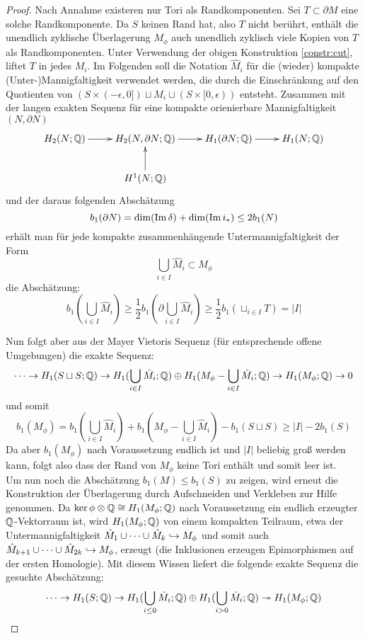 \begin{proof}
	 Nach Annahme existeren nur Tori als Randkomponenten. Sei $T \subset \partial M$ eine solche Randkomponente. Da $S$ keinen Rand hat, also $T$ nicht berührt, enthält die unendlich zyklische Überlagerung $M_\phi$ auch unendlich zyklisch viele Kopien von $T$ als Randkomponenten. Unter Verwendung der obigen Konstruktion \ref{constr:cut}, liftet $T$ in jedes $M_i$. Im Folgenden soll die Notation $\hat M_i$ für die (wieder) kompakte (Unter-)Mannigfaltigkeit verwendet werden, die durch die Einschränkung auf den Quotienten von $(S\times (-\epsilon,0]) \sqcup M_i \sqcup (S\times[0,\epsilon))$   entsteht. Zusammen mit der langen exakten Sequenz für eine kompakte orienierbare Mannigfaltigkeit $(N,\partial N)$
	\[
	 \begin{xy}
	 	\xymatrix{
	 	H_2(N;\QQ) \ar[r]&  H_2(N,\partial N ; \QQ) \ar[r]& H_1(\partial N;\QQ) \ar[r]& H_1(N;\QQ) \\
	 	& H^1(N;\QQ)\ar[u]&&}
	 \end{xy}
	 \] 
	 und der daraus folgenden Abschätzung
	 \[
	 	b_1(\partial N) = \dim(\operatorname{Im} \delta) + \dim(\operatorname{Im} i_*) \leq  2b_1(N)
	 \]
	 erhält man für jede kompakte zusammenhängende Untermannigfaltigkeit der Form
	 \[
	  	\bigcup_{i\in I} \hat M_i \subset M_\phi
	  \]
	  die Abschätzung:
	  \[
	   	b_1(\bigcup_{i\in I} \hat M_i)\geq \frac{1}{2}b_1(\partial \bigcup_{i\in I} \hat M_i) \geq \frac{1}{2}b_1(\sqcup_{i \in I}T) = |I|
	  \]


	  Nun folgt aber aus der Mayer Vietoris Sequenz (für entsprechende offene Umgebungen) die exakte Sequenz:
	  \[
	  	\cdots\to H_1(S\sqcup S;\mathbb{Q}) \to H_1(\bigcup_{i \in I} \hat M_i;\mathbb{Q}) \oplus H_1(M_\phi -\bigcup_{i \in I} \hat M_i;\mathbb{Q}) \to H_1(M_\phi;\mathbb{Q}) \to 0
	  \]
	  und somit
	  \[
	  	b_1(M_\phi)= b_1(\bigcup_{i \in I} \hat M_i)+b_1(M_\phi -\bigcup_{i \in I} \hat M_i)-b_1(S\sqcup S) \geq |I| -2b_1(S)
	  \]
	  Da aber $b_1(M_\phi)$ nach Voraussetzung endlich ist und $|I|$ beliebig groß werden kann, folgt also dass der Rand von $M_\phi$ keine Tori enthält und somit leer ist.\\
	  Um nun noch die Abschätzung $b_1(M) \leq b_1(S)$ zu zeigen, wird erneut die Konstruktion der Überlagerung durch Aufschneiden und Verkleben zur Hilfe genommen. Da $\ker\phi \otimes \mathbb{Q} \cong H_1(M_\phi;\mathbb{Q})$ nach Voraussetzung ein endlich erzeugter $\mathbb{Q}$-Vektorraum ist, wird $H_1(M_\phi;\mathbb{Q})$ von einem kompakten Teilraum, etwa der Untermannigfaltigkeit $\hat M_1 \cup \cdots \cup \hat M_k \hookrightarrow M_\phi$ und somit auch $\hat M_{k+1} \cup \cdots \cup \hat M_{2k}\hookrightarrow M_\phi$, erzeugt (die Inklusionen erzeugen Epimorphismen auf der ersten Homologie). Mit diesem Wissen liefert die folgende exakte Sequenz die gesuchte Abschätzung:
	  \[
	  	\cdots \to H_1(S;\mathbb{Q}) \to H_1(\bigcup_{i\leq 0}\hat M_i;\mathbb{Q}) \oplus H_1(\bigcup_{i>0} \hat M_i;\mathbb{Q}) \twoheadrightarrow H_1(M_\phi;\mathbb{Q})
	  \]
\end{proof}

